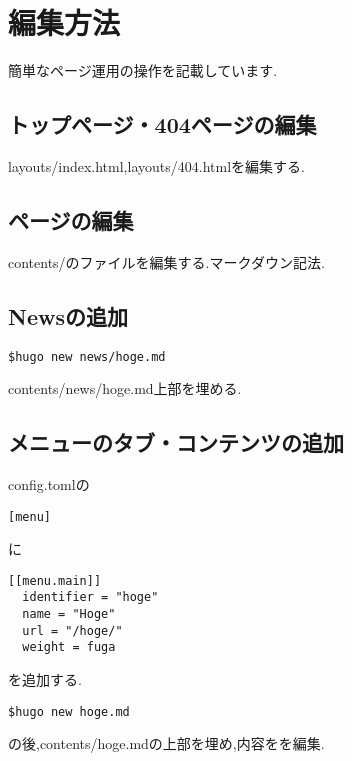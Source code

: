 \section{編集方法}
簡単なページ運用の操作を記載しています.

\subsection{トップページ・404ページの編集}
layouts/index.html,layouts/404.htmlを編集する.

\subsection{ページの編集}
contents/のファイルを編集する.マークダウン記法.

\subsection{Newsの追加}
\begin{lstlisting}[]
  $hugo new news/hoge.md
\end{lstlisting}

contents/news/hoge.md上部を埋める.

\subsection{メニューのタブ・コンテンツの追加}
config.tomlの
\begin{lstlisting}[]
  [menu]
\end{lstlisting}
に
\begin{lstlisting}[]
[[menu.main]]
  identifier = "hoge"
  name = "Hoge"
  url = "/hoge/"
  weight = fuga
\end{lstlisting}
を追加する.

\begin{lstlisting}[]
  $hugo new hoge.md
\end{lstlisting}
の後,contents/hoge.mdの上部を埋め,内容をを編集.